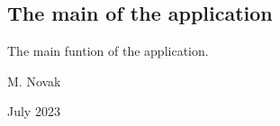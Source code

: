 \documentclass[letterpaper,10pt,english]{sphinxmanual}
\begin{document}
\subsection{The main of the  application}
\label{\detokenize{Simulation/SimulationCodeDoc:the-main-of-the-hepemshow-application}}
\sphinxAtStartPar
The main funtion of the  application. 

\sphinxAtStartPar
\begin{description}
\sphinxAtStartPar
M. Novak 

\sphinxAtStartPar
July 2023

\end{description}
\end{document}
